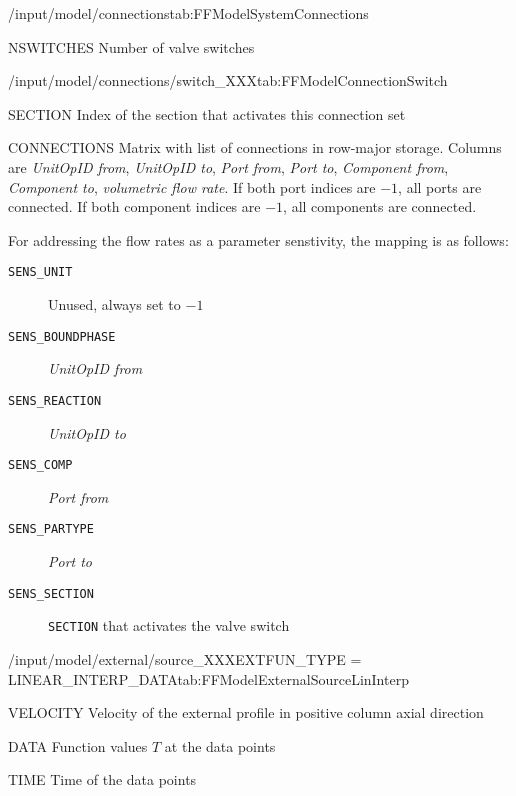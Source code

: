 \begin{groupscope}{/input/model/connections}{tab:FFModelSystemConnections}
  \begin{dataset}[type=int,range={$\geq 1$},length=1]{NSWITCHES}
    Number of valve switches
  \end{dataset}
\end{groupscope}

\begin{groupscope}{/input/model/connections/switch\_XXX}{tab:FFModelConnectionSwitch}
  \begin{dataset}[type=int,range={$\geq 0$},length=1]{SECTION}
    Index of the section that activates this connection set
  \end{dataset}
  \begin{dataset}[type=double,range={$\geq -1$},length={$7 \cdot \texttt{NCONNECTIONS}$}]{CONNECTIONS}
    Matrix with list of connections in row-major storage.
    Columns are \emph{UnitOpID from}, \emph{UnitOpID to}, \emph{Port from}, \emph{Port to}, \emph{Component from}, \emph{Component to}, \emph{volumetric flow rate}.
    If both port indices are $-1$, all ports are connected.
    If both component indices are $-1$, all components are connected.

    For addressing the flow rates as a parameter senstivity, the mapping is as follows:
    \begin{description}
      \item[\texttt{SENS\_UNIT}] Unused, always set to $-1$
      \item[\texttt{SENS\_BOUNDPHASE}] \emph{UnitOpID from}
      \item[\texttt{SENS\_REACTION}] \emph{UnitOpID to}
      \item[\texttt{SENS\_COMP}] \emph{Port from}
      \item[\texttt{SENS\_PARTYPE}] \emph{Port to}
      \item[\texttt{SENS\_SECTION}] \texttt{SECTION} that activates the valve switch
    \end{description}\vspace{-\baselineskip}
  \end{dataset}
\end{groupscope}

\begin{condsubgroup}{/input/model/external/source\_XXX}{EXTFUN\_TYPE = LINEAR\_INTERP\_DATA}{tab:FFModelExternalSourceLinInterp}
  \begin{dataset}[type=double,unit=\si{\per\second},range={$\geq 0$},length=1]{VELOCITY}
    Velocity of the external profile in positive column axial direction
  \end{dataset}
  \begin{dataset}[type=double,unit=\si{\ExternalUnit},range={$\mathds{R}$},length=Arbitrary]{DATA}
    Function values $T$ at the data points
  \end{dataset}
  \begin{dataset}[type=double,unit=\si{\second},range={$\geq 0.0$},length={Same as \texttt{DATA}}]{TIME}
    Time of the data points
  \end{dataset}
\end{condsubgroup}

